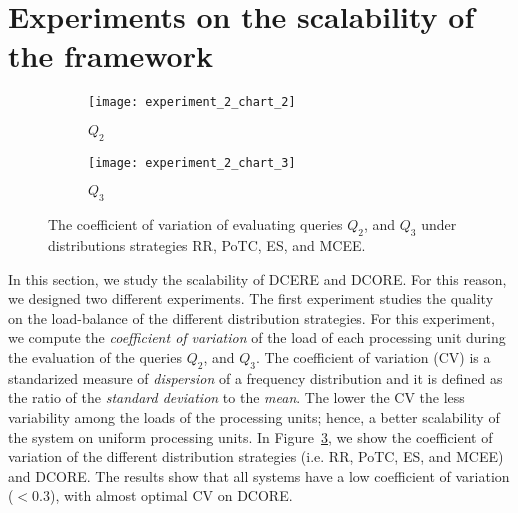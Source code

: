 \section{Experiments on the scalability of the framework}\label{sec:scalability}

\begin{figure}[b]
     \begin{adjustbox}{max width=1.5\linewidth,center}
     \centering
     \begin{subfigure}[b]{0.6\textwidth}
         \centering
         \texttt{[image: experiment\_2\_chart\_2]}
         \caption{$Q_{2}$}
         \label{fig:experiment:2:subfigure:2}
     \end{subfigure}
     \begin{subfigure}[b]{0.6\textwidth}
         \centering
         \texttt{[image: experiment\_2\_chart\_3]}
         \caption{$Q_{3}$}
         \label{fig:experiment:2:subfigure:3}
     \end{subfigure}
     \end{adjustbox}
     \caption{The coefficient of variation of evaluating queries $Q_{2}$, and $Q_{3}$ under distributions strategies RR, PoTC, ES, and MCEE.}
     \label{fig:experiment:2}
\end{figure}

In this section, we study the scalability of DCERE and DCORE. For this reason, we designed two different experiments. The first experiment studies the quality on the load-balance of the different distribution strategies. For this experiment, we compute the \emph{coefficient of variation} of the load of each processing unit during the evaluation of the queries $Q_{2}$, and $Q_{3}$. The coefficient of variation (CV) is a standarized measure of \emph{dispersion} of a frequency distribution and it is defined as the ratio of the \emph{standard deviation} to the \emph{mean}. The lower the CV the less variability among the loads of the processing units; hence, a better scalability of the system on uniform processing units. In Figure~\ref{fig:experiment:2}, we show the coefficient of variation of the different distribution strategies (i.e. RR, PoTC, ES, and MCEE) and DCORE. The results show that all systems have a low coefficient of variation ($< 0.3$), with almost optimal CV on DCORE.

